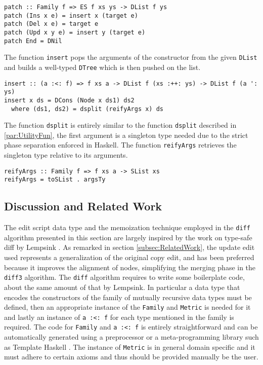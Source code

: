 \documentclass[../Thesis.tex]{subfiles}
\begin{document}
\begin{verbatim}
patch :: Family f => ES f xs ys -> DList f ys
patch (Ins x e) = insert x (target e)
patch (Del x e) = target e
patch (Upd x y e) = insert y (target e)
patch End = DNil
\end{verbatim}

	The function \texttt{insert} pops the arguments of the 
	constructor from the given \texttt{DList} and builds
	a well-typed \texttt{DTree} which is then pushed on the list.

\begin{verbatim}
insert :: (a :<: f) => f xs a -> DList f (xs :++: ys) -> DList f (a ': ys)
insert x ds = DCons (Node x ds1) ds2
  where (ds1, ds2) = dsplit (reifyArgs x) ds
\end{verbatim}

	The function \texttt{dsplit} is entirely similar to the function
	\texttt{dsplit} described in \ref{par:UtilityFun}, the first 
	argument is a singleton type needed due to the strict
	phase separation enforced in Haskell.
	The function \texttt{reifyArgs} retrieves the singleton
	type relative to its arguments.

\begin{verbatim}
reifyArgs :: Family f => f xs a -> SList xs
reifyArgs = toSList . argsTy
\end{verbatim}

	\subsection{Discussion and Related Work}
	The edit script data type and the memoization technique 
	employed in the \texttt{diff} algorithm presented in this section
	are largely inspired by the work on type-safe diff by 
	Lempsink \cite{Lemp09}.
	As remarked in section \ref{subsec:RelatedWork}, the update
	edit used represents a generalization of the original copy edit, 
	and has been preferred because it improves the alignment of nodes, 
	simplifying the merging phase in the \texttt{diff3} algorithm.
	The \texttt{diff} algorithm requires to write some boilerplate code, about
	the same amount of that by Lempsink.
	In particular a data type that encodes the constructors of the
	family of mutually recursive data types must be defined, then
	an appropriate instance of the \texttt{Family} and \texttt{Metric} is needed
	for it and lastly an instance of \texttt{a :<: f} for each type mentioned in the 
	family is required. The code for \texttt{Family} and \texttt{a :<: f} is
	entirely straightforward and can be automatically generated using
	a preprocessor or a meta-programming library such as Template Haskell
	\cite{TemplateHaskell}. The instance of \texttt{Metric} is in general
	domain specific and it must adhere to certain axioms and thus should
	be provided manually be the user.
\end{document}
